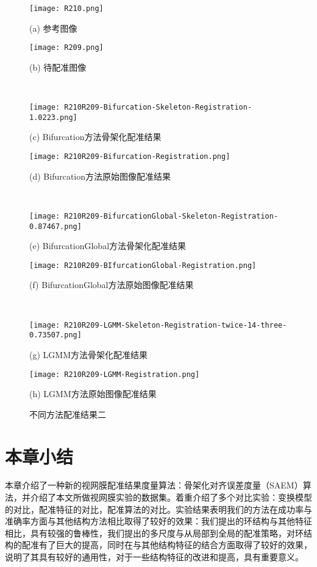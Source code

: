 \begin{figure}
\centering
\begin{minipage}[b]{0.42\linewidth} 
      \centering 
      \texttt{[image: R210.png]}
        \centerline{\footnotesize{(a) 参考图像}}\medskip
\end{minipage}
  \begin{minipage}[b]{0.42\linewidth}
    \centering
    \texttt{[image: R209.png]}
      \centerline{\footnotesize {(b) 待配准图像}}\medskip
  \end{minipage}
  \\
    \begin{minipage}[b]{0.42\linewidth}
    \centering
    \texttt{[image: R210R209-Bifurcation-Skeleton-Registration-1.0223.png]}
      \centerline{\footnotesize {(c) Bifurcation方法骨架化配准结果}}\medskip
  \end{minipage}
    \begin{minipage}[b]{0.42\linewidth}
    \centering
    \texttt{[image: R210R209-Bifurcation-Registration.png]}
      \centerline{\footnotesize {(d) Bifurcation方法原始图像配准结果}}\medskip
  \end{minipage}
  \\
  \begin{minipage}[b]{0.42\linewidth}
    \centering
    \texttt{[image: R210R209-BifurcationGlobal-Skeleton-Registration-0.87467.png]}
      \centerline{\footnotesize {(e) BifurcationGlobal方法骨架化配准结果}}\medskip
  \end{minipage}
  \begin{minipage}[b]{0.42\linewidth}
    \centering
    \texttt{[image: R210R209-BIfurcationGlobal-Registration.png]}
      \centerline{\footnotesize {(f) BifurcationGlobal方法原始图像配准结果}}\medskip
  \end{minipage}
  \\
     \begin{minipage}[b]{0.42\linewidth}
    \centering
    \texttt{[image: R210R209-LGMM-Skeleton-Registration-twice-14-three-0.73507.png]}
      \centerline{\footnotesize {(g) LGMM方法骨架化配准结果}}\medskip
  \end{minipage}
   \begin{minipage}[b]{0.42\linewidth}
    \centering
    \texttt{[image: R210R209-LGMM-Registration.png]}
      \centerline{\footnotesize {(h) LGMM方法原始图像配准结果}}\medskip
  \end{minipage}
 \caption{不同方法配准结果二}
\label{m2}
\end{figure} 

\section{本章小结}
本章介绍了一种新的视网膜配准结果度量算法：骨架化对齐误差度量（SAEM）算法，并介绍了本文所做视网膜实验的数据集。着重介绍了多个对比实验：变换模型的对比，配准特征的对比，配准算法的对比。实验结果表明我们的方法在成功率与准确率方面与其他结构方法相比取得了较好的效果：我们提出的环结构与其他特征相比，具有较强的鲁棒性，我们提出的多尺度与从局部到全局的配准策略，对环结构的配准有了巨大的提高，同时在与其他结构特征的结合方面取得了较好的效果，说明了其具有较好的通用性，对于一些结构特征的改进和提高，具有重要意义。
